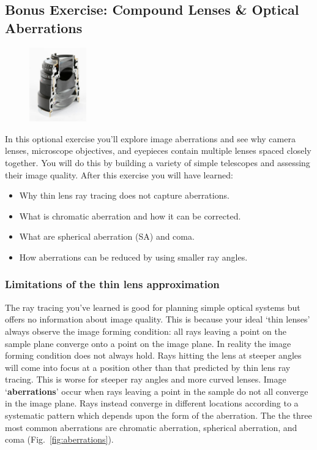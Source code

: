 \documentclass[a4paper]{report}
\begin{document}
\subsection{Bonus Exercise: Compound Lenses \& Optical Aberrations}
\begin{figure}
  \begin{center}
    \includegraphics[width=0.22\textwidth]{SLR_lens_cut_in_half.eps}

  \end{center}
  \vspace{-100pt} 
\end{figure}
In this optional exercise you'll explore image aberrations and see why camera lenses, microscope objectives, and eyepieces contain multiple lenses spaced closely together. 
You will do this by building a variety of simple telescopes and assessing their image quality.
After this exercise you will have learned:
\begin{itemize}
    \setlength\itemsep{0.15em}
    \item Why thin lens ray tracing does not capture aberrations.
    \item What is chromatic aberration and how it can be corrected.
    \item What are spherical aberration (SA) and coma.
    \item How aberrations can be reduced by using smaller ray angles.
\end{itemize}


\subsubsection{Limitations of the thin lens approximation}
The ray tracing you've learned is good for planning simple optical systems but offers no information about image quality. 
This is because your ideal `thin lenses' always observe the image forming condition: all rays leaving a point on the sample plane converge onto a point on the image plane. 
In reality the image forming condition does not always hold. 
Rays hitting the lens at steeper angles will come into focus at a position other than that predicted by thin lens ray tracing. 
This is worse for steeper ray angles and more curved lenses. 
Image `\textbf{aberrations}' occur when rays leaving a point in the sample do not all converge in the image plane.
Rays instead converge in different locations according to a systematic pattern which depends upon the form of the aberration. 
The the three most common aberrations are chromatic aberration, spherical aberration, and coma (Fig.~\ref{fig:aberrations}). 
\end{document}
